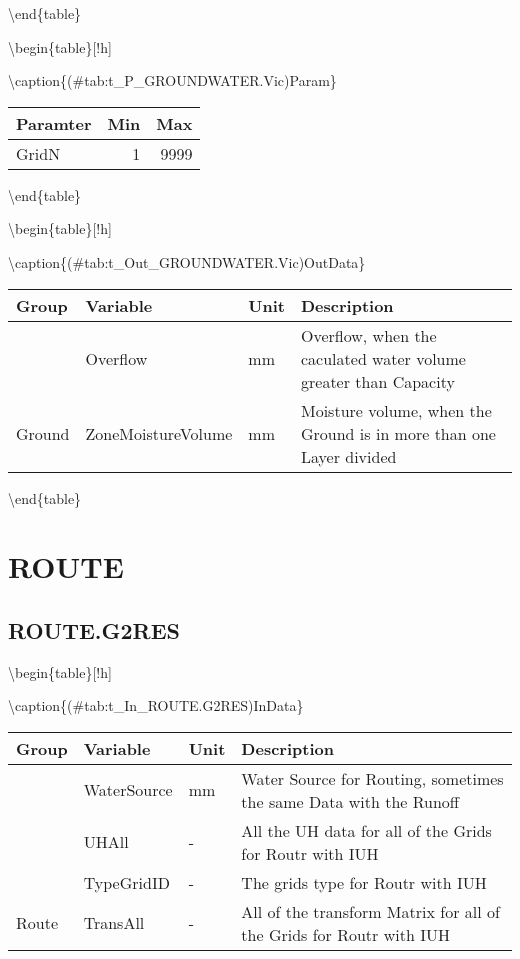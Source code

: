 \documentclass[
]{book}
\begin{document}
\textbackslash end\{table\}

\textbackslash begin\{table\}{[}!h{]}

\textbackslash caption\{(\#tab:t\_P\_GROUNDWATER.Vic)Param\}
\centering

\begin{tabular}[t]{l|r|r}
\hline
Paramter & Min & Max\\
\hline
GridN & 1 & 9999\\
\hline
\end{tabular}

\textbackslash end\{table\}

\textbackslash begin\{table\}{[}!h{]}

\textbackslash caption\{(\#tab:t\_Out\_GROUNDWATER.Vic)OutData\}
\centering

\begin{tabular}[t]{l|l|l|l}
\hline
Group & Variable & Unit & Description\\
\hline
 & Overflow & mm & Overflow, when the caculated water volume greater than Capacity\\
\cline{2-4}
\multirow{-2}{*}{\raggedright\arraybackslash Ground} & ZoneMoistureVolume & mm & Moisture volume, when the Ground is in more than one Layer divided\\
\hline
\end{tabular}

\textbackslash end\{table\}

\hypertarget{route}{%
\section{ROUTE}\label{route}}

\hypertarget{route.g2res}{%
\subsection{ROUTE.G2RES}\label{route.g2res}}

\textbackslash begin\{table\}{[}!h{]}

\textbackslash caption\{(\#tab:t\_In\_ROUTE.G2RES)InData\}
\centering

\begin{tabular}[t]{l|l|l|l}
\hline
Group & Variable & Unit & Description\\
\hline
 & WaterSource & mm & Water Source for Routing, sometimes the same Data with the Runoff\\
\cline{2-4}
 & UHAll & - & All the UH data for all of the Grids for Routr with IUH\\
\cline{2-4}
 & TypeGridID & - & The grids type for Routr with IUH\\
\cline{2-4}
\multirow{-4}{*}{\raggedright\arraybackslash Route} & TransAll & - & All of the transform Matrix for all of the Grids for Routr with IUH\\
\hline
\end{tabular}
\end{document}
